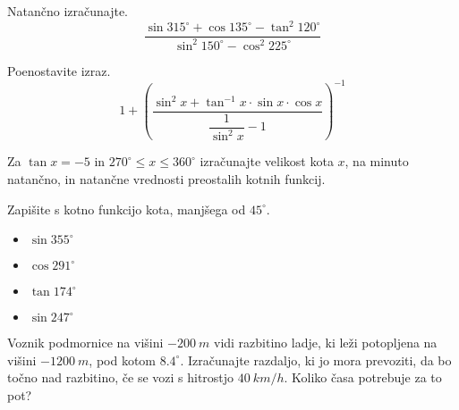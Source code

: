        


        
            \begin{naloga}
                Natančno izračunajte.
                $$\displaystyle \dfrac{\sin{315^\circ}+\cos{135^\circ}-\tan^2{120^\circ}}{\sin^2{150^\circ}-\cos^2{225^\circ}} $$
            \end{naloga}


            \begin{naloga}
                Poenostavite izraz.
                $$\displaystyle 1+\left(\dfrac{\sin^2{x}+\tan^{-1}{x}\cdot\sin{x}\cdot\cos{x}}{\dfrac{1}{\sin^2{x}}-1}\right)^{-1} $$
            \end{naloga}


            \begin{naloga}
                Za $\tan{x}=-5$ in $270^\circ\leq x\leq 360^\circ$ izračunajte velikost kota $x$, na minuto natančno, in natančne vrednosti preostalih kotnih funkcij.
            \end{naloga}

        


        
            \begin{naloga}
                Zapišite s kotno funkcijo kota, manjšega od $45^\circ$.
                \begin{itemize}
                    \item $\sin{355^\circ} $
                    \item $\cos{291^\circ} $
                    \item $\tan{174^\circ} $
                    \item $\sin{247^\circ} $ 
                \end{itemize}
            \end{naloga}


            \begin{naloga}
                Voznik podmornice na višini $-200~m$ vidi razbitino ladje, ki leži potopljena na višini $-1200~m$, pod kotom $8.4^\circ$.
                Izračunajte razdaljo, ki jo mora prevoziti, da bo točno nad razbitino, če se vozi s hitrostjo $40~km/h$.
                Koliko časa potrebuje za to pot?
            \end{naloga}

        





